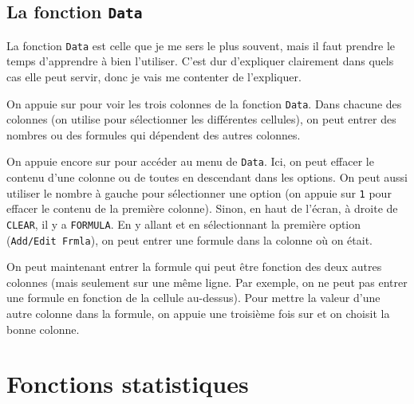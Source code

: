 \subsection{La fonction \texttt{Data}}
La fonction \texttt{Data} est celle que je me sers le plus souvent, mais il faut prendre le temps d'apprendre à bien l'utiliser. C'est dur d'expliquer clairement dans quels cas elle peut servir, donc je vais me contenter de l'expliquer.

On appuie sur  pour voir les trois colonnes de la fonction \texttt{Data}. Dans chacune des colonnes (on utilise  pour sélectionner les différentes cellules), on peut entrer des nombres ou des formules qui dépendent des autres colonnes.

On appuie encore sur  pour accéder au menu de \texttt{Data}. Ici, on peut effacer le contenu d'une colonne ou de toutes en descendant dans les options. On peut aussi utiliser le nombre à gauche pour sélectionner une option (on appuie sur \texttt{1} pour effacer le contenu de la première colonne). Sinon, en haut de l'écran, à droite de \texttt{CLEAR}, il y a \texttt{FORMULA}. En y allant et en sélectionnant la première option (\texttt{Add/Edit Frmla}), on peut entrer une formule dans la colonne où on était. 

On peut maintenant entrer la formule qui peut être fonction des deux autres colonnes (mais seulement sur une même ligne. Par exemple, on ne peut pas entrer une formule en fonction de la cellule au-dessus). Pour mettre la valeur d'une autre colonne dans la formule, on appuie une troisième fois sur  et on choisit la bonne colonne.

\section{Fonctions statistiques}

